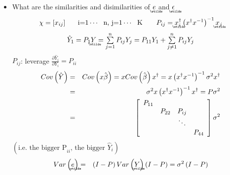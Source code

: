 \documentclass{article}
\begin{document}
\begin{itemize}
\item What are the similarities and disimilarities of $%
\underaccent{\wtilde}{e}%
$ and $%
\underaccent{\wtilde}{\epsilon}%
$%
\begin{equation*}
\chi =\left[ x_{ij}\right] \quad \text{i=1}\cdots \text{n, j=1}\cdots \text{K%
}\qquad P_{ij}=%
\underaccent{\wtilde}{x}%
_{i}^{\dagger }\left( x^{\dagger }x^{-1}\right) ^{-1}%
\underaccent{\wtilde}{x}%
_{j}
\end{equation*}%
\begin{equation*}
\hat{Y}_{1}=P_{1}%
\underaccent{\wtilde}{Y}%
=\tsum\limits_{j=1}^{n}P_{ij}Y_{j}=P_{11}Y_{1}+\tsum\limits_{j\neq
1}^{n}P_{ij}Y_{j}
\end{equation*}%
$P_{ij}$: leverage $\frac{\partial \hat{Y}_{i}}{\partial Y_{i}}=P_{ii}$%
\begin{eqnarray*}
Cov\left( \hat{Y}\right) &=&Cov\left( x\hat{\beta}\right) =xCov\left( \hat{%
\beta}\right) x^{\dagger }=x\left( x^{\dagger }x^{-1}\right) ^{-1}\sigma
^{2}x^{\dagger } \\
&=&\sigma ^{2}x\left( x^{\dagger }x^{-1}\right) ^{-1}x^{\dagger }=P\sigma
^{2} \\
&=&\left[ 
\begin{array}{cccc}
P_{11} &  &  &  \\ 
& P_{22} & P_{ij} &  \\ 
&  & \ddots &  \\ 
&  &  & P_{44}%
\end{array}%
\right] \sigma ^{2}
\end{eqnarray*}%
$\left( \text{i.e. the bigger P}_{ii}\text{, the bigger }\hat{Y}_{i}\right) $%
\begin{eqnarray*}
Var\left( 
\underaccent{\wtilde}{e}%
\right) &=&\left( I-P\right) Var\left( 
\underaccent{\wtilde}{Y}%
\right) \left( I-P\right) =\sigma ^{2}\left( I-P\right) \\

\end{eqnarray*}
\end{itemize}
\end{document}
